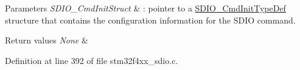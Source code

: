 \begin{DoxyParams}{Parameters}
{\em S\-D\-I\-O\-\_\-\-Cmd\-Init\-Struct} & \-: pointer to a \hyperlink{struct_s_d_i_o___cmd_init_type_def}{S\-D\-I\-O\-\_\-\-Cmd\-Init\-Type\-Def} structure that contains the configuration information for the S\-D\-I\-O command. \\
\hline
\end{DoxyParams}

\begin{DoxyRetVals}{Return values}
{\em None} & \\
\hline
\end{DoxyRetVals}


Definition at line 392 of file stm32f4xx\-\_\-sdio.\-c.


